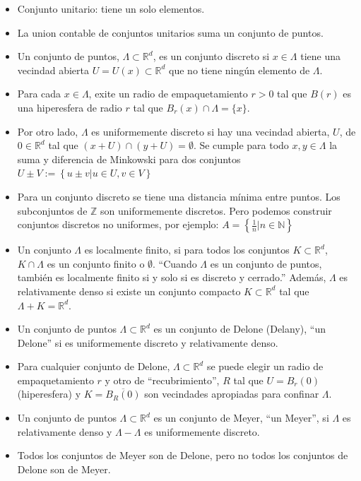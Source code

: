 \begin{itemize}
    \item Conjunto unitario: tiene un solo elementos.
    \item La union contable de conjuntos unitarios suma un conjunto de puntos.
    \item Un conjunto de puntos, $\Lambda\subset \mathbb{R}^d$, es un conjunto discreto si $x\in \Lambda$ tiene una vecindad abierta $U=U(x)\subset \mathbb{R}^d$ que no tiene ningún elemento de $\Lambda$.
    \item Para cada $x\in\Lambda$, exite un radio de empaquetamiento $r>0$ tal que $B(r)$ es una hiperesfera de radio $r$ tal que $B_r(x) \cap \Lambda=\{x\}$.
    \item Por otro lado, $\Lambda$ es uniformemente discreto si hay una vecindad abierta, $U$, de $0\in\mathbb{R}^d$ tal que $(x+U)\cap(y+U)=\emptyset$. Se cumple para todo $x,y\in\Lambda$ la suma y diferencia de Minkowski para dos conjuntos $U\pm V:=\left\{u\pm v \lvert u \in U,v\in V\right\}$
    \item Para un conjunto discreto se tiene una distancia mínima entre puntos. Los subconjuntos de $\mathbb{Z}$ son uniformemente discretos. Pero podemos construir conjuntos discretos no uniformes, por ejemplo: $A=\left\{\frac{1}{n}\lvert n\in \mathbb{N}\right\}$
    \item Un conjunto $\Lambda$ es localmente finito, si para todos los conjuntos $K\subset \mathbb{R}^d$, $K\cap\Lambda$ es un conjunto finito o $\emptyset$. 
    ``Cuando $\Lambda$ es un conjunto de puntos, también es localmente finito si y solo si es discreto y cerrado.'' Además, $\Lambda$ es relativamente denso si existe un conjunto compacto $K\subset \mathbb{R}^d$ tal que $\Lambda+K=\mathbb{R}^d$.
    \item Un conjunto de puntos $\Lambda\subset\mathbb{R}^d$ es un conjunto de Delone (Delany), ``un Delone'' si es uniformemente discreto y relativamente denso.
    \item Para cualquier conjunto de Delone, $\Lambda\subset \mathbb{R}^d$ se puede elegir un radio de empaquetamiento $r$ y otro de ``recubrimiento'', $R$ tal que $U=B_r(0)$ (hiperesfera) y $K=\overline{B_R(0)}$ son vecindades apropiadas para confinar $\Lambda$.
    \item Un conjunto de puntos $\Lambda\subset \mathbb{R}^d$ es un conjunto de Meyer, ``un Meyer'', si $\Lambda$ es relativamente denso y $\Lambda-\Lambda$ es uniformemente discreto.
    \item Todos los conjuntos de Meyer son de Delone, pero no todos los conjuntos de Delone son de Meyer.
\end{itemize}

